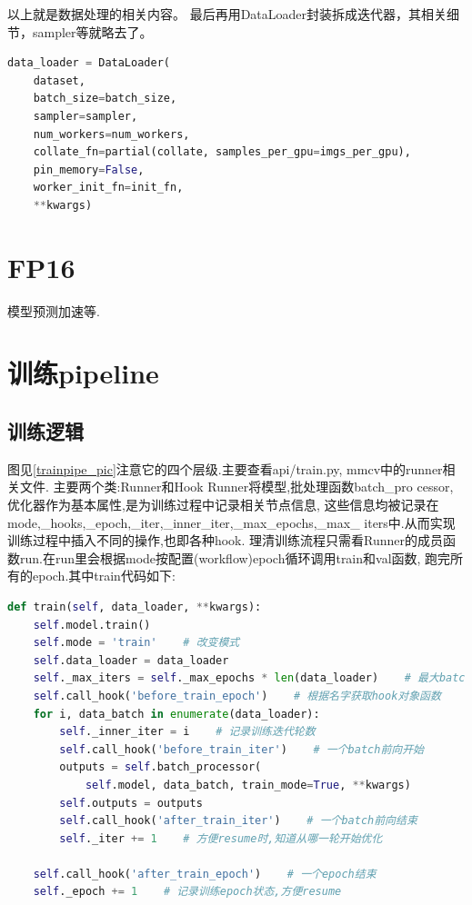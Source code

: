 \documentclass[UTF8]{ctexart}
\begin{document}
以上就是数据处理的相关内容。
最后再用DataLoader封装拆成迭代器，其相关细节，sampler等就略去了。
\lstset{style=mystyle}
\begin{lstlisting}[language=Python]
data_loader = DataLoader(
	dataset,
	batch_size=batch_size,
	sampler=sampler,
	num_workers=num_workers,
	collate_fn=partial(collate, samples_per_gpu=imgs_per_gpu),
	pin_memory=False,
	worker_init_fn=init_fn,
	**kwargs)
\end{lstlisting}


\section{FP16}
模型预测加速等.


\section{训练pipeline}
\label{trainpipeline}
\subsection{训练逻辑}
图见\ref{trainpipe_pic}注意它的四个层级.主要查看api/train.py, mmcv中的runner相关文件.
主要两个类:Runner和Hook
Runner将模型,批处理函数batch\_pro
cessor,优化器作为基本属性,是为训练过程中记录相关节点信息,
这些信息均被记录在mode,\_hooks,\_epoch,\_iter,\_inner\_iter,\_max\_epochs,\_max\_
iters中.从而实现训练过程中插入不同的操作,也即各种hook.
理清训练流程只需看Runner的成员函数run.在run里会根据mode按配置(workflow)epoch循环调用train和val函数,
跑完所有的epoch.其中train代码如下:
\lstset{style=mystyle}
\begin{lstlisting}[language=Python]
 def train(self, data_loader, **kwargs):
	self.model.train()
	self.mode = 'train'    # 改变模式
	self.data_loader = data_loader
	self._max_iters = self._max_epochs * len(data_loader)    # 最大batch循环次数
	self.call_hook('before_train_epoch')    # 根据名字获取hook对象函数
	for i, data_batch in enumerate(data_loader):
		self._inner_iter = i    # 记录训练迭代轮数
		self.call_hook('before_train_iter')    # 一个batch前向开始
		outputs = self.batch_processor(
			self.model, data_batch, train_mode=True, **kwargs)
		self.outputs = outputs
		self.call_hook('after_train_iter')    # 一个batch前向结束
		self._iter += 1    # 方便resume时,知道从哪一轮开始优化

	self.call_hook('after_train_epoch')    # 一个epoch结束
	self._epoch += 1    # 记录训练epoch状态,方便resume

\end{lstlisting}
\end{document}

